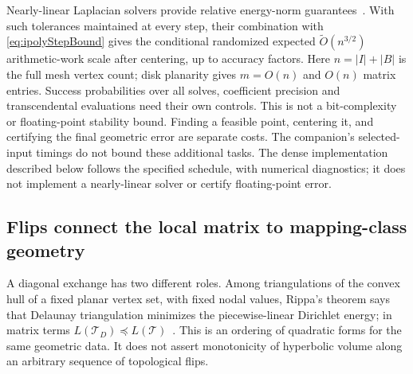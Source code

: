 Nearly-linear Laplacian solvers provide relative energy-norm
guarantees~\cite[Theorem~5.5]{SpielmanTengSolvers}. With such tolerances
maintained at every step, their combination with
\eqref{eq:ipolyStepBound} gives the conditional randomized expected
$\widetilde O(n^{3/2})$ arithmetic-work scale after centering, up to
accuracy factors. Here $n=|I|+|B|$ is the full mesh vertex count;
disk planarity gives $m=O(n)$ and $O(n)$ matrix entries.
Success probabilities over all solves,
coefficient precision and transcendental evaluations need their own
controls. This is not a bit-complexity or floating-point stability
bound. Finding a feasible point, centering it, and certifying the final
geometric error are separate costs. The companion's selected-input
timings do not bound these additional tasks. The dense implementation
described below follows the specified schedule, with numerical diagnostics;
it does not implement a nearly-linear solver or certify floating-point error.

\subsection{Flips connect the local matrix to mapping-class geometry}
\label{subsec:ipolyFlips}

A diagonal exchange has two different roles. Among triangulations of
the convex hull of a fixed planar vertex set, with fixed nodal values,
Rippa's theorem says that Delaunay
triangulation minimizes the piecewise-linear Dirichlet energy; in matrix
terms $L(\mathcal T_D)\preccurlyeq L(\mathcal T)$~\cite{RippaEnergy}.
This is an ordering of quadratic forms for the same geometric data.
It does not assert monotonicity of hyperbolic volume along an arbitrary
sequence of topological flips.


